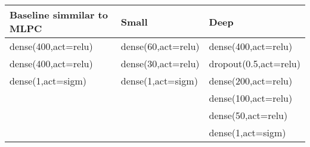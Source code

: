 \begin{tabular}{lll}
\hline
\multicolumn{1}{|l|}{Baseline simmilar to MLPC} & \multicolumn{1}{l|}{Small} & \multicolumn{1}{l|}{Deep} \\ \hline
dense(400,act=relu)                             & dense(60,act=relu)         & dense(400,act=relu)       \\
dense(400,act=relu)                             & dense(30,act=relu)         & dropout(0.5,act=relu)     \\
dense(1,act=sigm)                               & dense(1,act=sigm)          & dense(200,act=relu)       \\
                                                &                            & dense(100,act=relu)       \\
                                                &                            & dense(50,act=relu)        \\
                                                &                            & dense(1,act=sigm)        
\end{tabular}